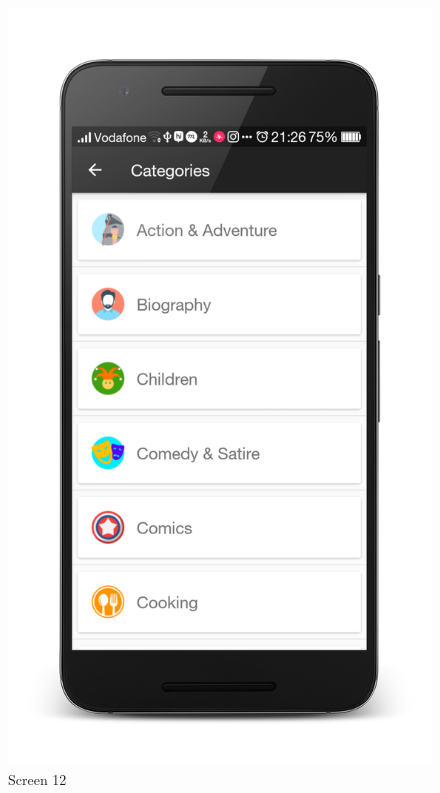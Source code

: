 \begin{figure}[ht]
\centering
\includegraphics[scale=0.13]{images/d8.png}
\caption{Screen 12}
\end{figure}

\newpage

